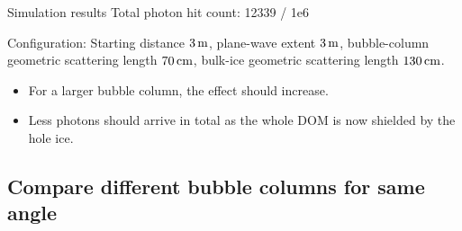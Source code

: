 \begin{frame}[fragile]{Simulation results}
  \tiny Total photon hit count: 12339 / 1e6

  \tiny Configuration: Starting distance $3\text{\,m}$, plane-wave extent $3\text{\,m}$, bubble-column geometric scattering length $70\text{\,cm}$, bulk-ice geometric scattering length $130\text{\,cm}$.
  \normalsize

  \begin{itemize}
    \item For a larger bubble column, the effect should increase.
    \item Less photons should arrive in total \tiny as the whole DOM is now shielded by the hole ice. \normalsize \checkmark
  \end{itemize}
\end{frame}

\subsection{Compare different bubble columns for same angle}
